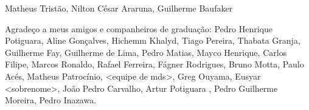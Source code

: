 \begin{agradecimentos}

Matheus Tristão, Nilton César Araruna, Guilherme Baufaker


Agradeço a meus amigos e companheiros de graduação: Pedro Henrique Potiguara, Aline Gonçalves, Hichemm Khalyd, Tiago Pereira, Thabata Granja, Guilherme Fay, Guilherme de Lima, Pedro Matias, Mayco Henrique, Carlos Filipe, Marcos Ronaldo, Rafael Ferreira, Fágner Rodrigues, Bruno Motta, Paulo Acés, Matheus Patrocínio, <equipe de mds>, Greg Ouyama, Eusyar <sobrenome>, João Pedro Carvalho, Artur Potiguara , Pedro Guilherme Moreira, Pedro Inazawa.


\end{agradecimentos}
